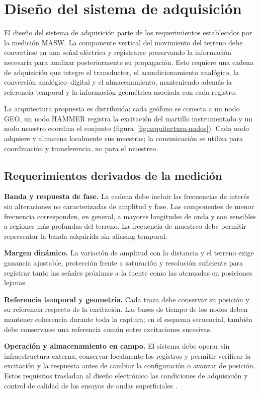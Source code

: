 \section{Diseño del sistema de adquisición}
\label{sec:diseno}

El diseño del sistema de adquisición parte de los requerimientos establecidos por la medición MASW. La componente vertical del movimiento del terreno debe convertirse en una señal eléctrica y registrarse preservando la información necesaria para analizar posteriormente su propagación. Esto requiere una cadena de adquisición que integre el transductor, el acondicionamiento analógico, la conversión analógico--digital y el almacenamiento, manteniendo además la referencia temporal y la información geométrica asociada con cada registro.

La arquitectura propuesta es distribuida: cada geófono se conecta a un nodo GEO, un nodo HAMMER registra la excitación del martillo instrumentado y un nodo maestro coordina el conjunto (figura~\ref{fig:arquitectura-nodos}). Cada nodo adquiere y almacena localmente sus muestras; la comunicación se utiliza para coordinación y transferencia, no para el muestreo.

\subsection{Requerimientos derivados de la medición}

\textbf{Banda y respuesta de fase.} La cadena debe incluir las frecuencias de interés sin alteraciones no caracterizadas de amplitud y fase. Las componentes de menor frecuencia corresponden, en general, a mayores longitudes de onda y son sensibles a regiones más profundas del terreno. La frecuencia de muestreo debe permitir representar la banda adquirida sin aliasing temporal.

\textbf{Margen dinámico.} La variación de amplitud con la distancia y el terreno exige ganancia ajustable, protección frente a saturación y resolución suficiente para registrar tanto las señales próximas a la fuente como las atenuadas en posiciones lejanas.

\textbf{Referencia temporal y geometría.} Cada traza debe conservar su posición y su referencia respecto de la excitación. Las bases de tiempo de los nodos deben mantener coherencia durante toda la captura; en el esquema secuencial, también debe conservarse una referencia común entre excitaciones sucesivas.

\textbf{Operación y almacenamiento en campo.} El sistema debe operar sin infraestructura externa, conservar localmente los registros y permitir verificar la excitación y la respuesta antes de cambiar la configuración o avanzar de posición. 
Estos requisitos trasladan al diseño electrónico las condiciones de adquisición y control de calidad de los ensayos de ondas superficiales \citep{Foti2018}.


